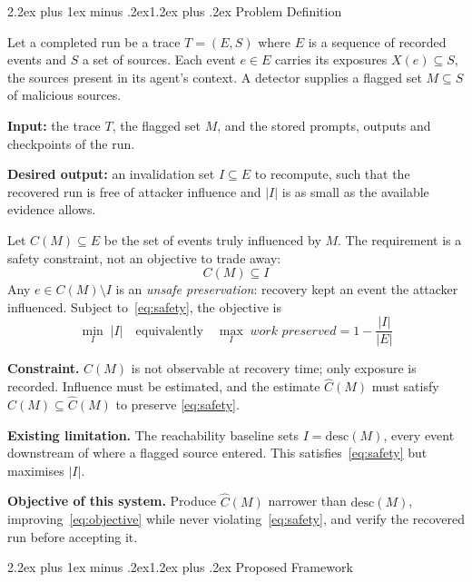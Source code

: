 \documentclass[10pt,twocolumn,a4paper]{article}
\makeatletter
\renewcommand{\section}{\@startsection{section}{1}{\z@}%
  {2.2ex plus 1ex minus .2ex}{1.2ex plus .2ex}%
  {\centering\normalfont\normalsize\scshape}}
\makeatother
\begin{document}
\section{Problem Definition}
\label{sec:prob}

Let a completed run be a trace $T=(E,S)$ where $E$ is a sequence of recorded
events and $S$ a set of sources. Each event $e \in E$ carries its exposures
$X(e)\subseteq S$, the sources present in its agent's context. A detector
supplies a flagged set $M \subseteq S$ of malicious sources.

\textbf{Input:} the trace $T$, the flagged set $M$, and the stored prompts,
outputs and checkpoints of the run.

\textbf{Desired output:} an invalidation set $I \subseteq E$ to recompute, such
that the recovered run is free of attacker influence and $|I|$ is as small as
the available evidence allows.

Let $C(M) \subseteq E$ be the set of events truly influenced by $M$. The
requirement is a safety constraint, not an objective to trade away:
\begin{equation}
C(M) \subseteq I
\label{eq:safety}
\end{equation}
Any $e \in C(M)\setminus I$ is an \emph{unsafe preservation}: recovery kept an
event the attacker influenced. Subject to~\eqref{eq:safety}, the objective is
\begin{equation}
\min_{I} \; |I| \quad\text{equivalently}\quad
\max_{I} \; \textit{work preserved} = 1 - \frac{|I|}{|E|}
\label{eq:objective}
\end{equation}

\textbf{Constraint.} $C(M)$ is not observable at recovery time; only exposure
is recorded. Influence must be estimated, and the estimate
$\hat{C}(M)$ must satisfy $C(M)\subseteq\hat{C}(M)$ to preserve
\eqref{eq:safety}.

\textbf{Existing limitation.} The reachability baseline sets
$I = \mathrm{desc}(M)$, every event downstream of where a flagged source
entered. This satisfies~\eqref{eq:safety} but maximises $|I|$.

\textbf{Objective of this system.} Produce $\hat{C}(M)$ narrower than
$\mathrm{desc}(M)$, improving~\eqref{eq:objective} while never
violating~\eqref{eq:safety}, and verify the recovered run before accepting it.

\section{Proposed Framework}
\label{sec:frame}
\end{document}
